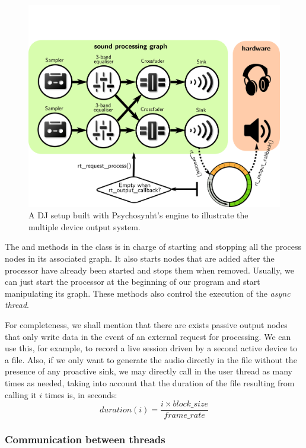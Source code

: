 \begin{figure}[h!]
  \centering
  \includegraphics[width=\textwidth]{pic/djscheme.png}
  \caption{A DJ setup built with Psychosynht's engine to illustrate the multiple device output system.}
  \label{fig:djscheme}
\end{figure}

The  and  methods in the 
class is in charge of starting and stopping all the process nodes in
its associated graph. It also starts nodes that are added after the
processor have already been started and stops them when
removed. Usually, we can just start the processor at the beginning of
our program and start manipulating its graph. These methods also
control the execution of the \emph{async thread}. 

For completeness, we shall mention that there are exists passive
output nodes that only write data in the event of an external request
for processing. We can use this, for example, to record a live session
driven by a second active device to a file. Also, if we only want to
generate the audio directly in the file without the presence of any
proactive sink, we may directly call  in
the user thread as many times as needed, taking into account that the
duration of the file resulting from calling it $i$ times is, in
seconds:
\begin{equation}
  duration(i) = \frac{i \times block\_size}{frame\_rate}   
\end{equation}

\subsubsection{Communication between threads}

